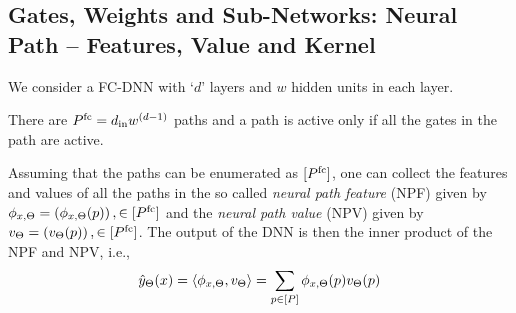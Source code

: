 \subsection{Gates, Weights and Sub-Networks: Neural Path -- Features, Value and Kernel}
We consider a FC-DNN with `$d$' layers and  $w$  hidden units in each layer. %
There are $P^{\text{fc}}=d_{\text{in}} w^{(d-1)}$ paths and a path is active only if all the gates in the path are active.
\begin{proposition}\label{prop:npf-npv}
 Assuming that the paths can be enumerated as $[P^{\text{fc}}]$, one can collect the features and values of all the paths in the so called \emph{neural path feature} (NPF) given by $\phi_{x,\Theta}=\left(\phi_{x,\Theta}(p)\right),\in[P^{\text{fc}}]$ and the \emph{neural path value} (NPV) given by $v_{\Theta}=\left(v_{\Theta}(p)\right),\in[P^{\text{fc}}]$. The output of the DNN is then the inner product of the NPF and NPV, i.e., 
\begin{align}\label{eq:inner}
\hat{y}_{\Theta}(x)=\langle \phi_{x,\Theta},v_{\Theta}\rangle=\sum_{p\in[P]}  \phi_{x,\Theta}(p) v_{\Theta}(p)
\end{align}
\end{proposition}
